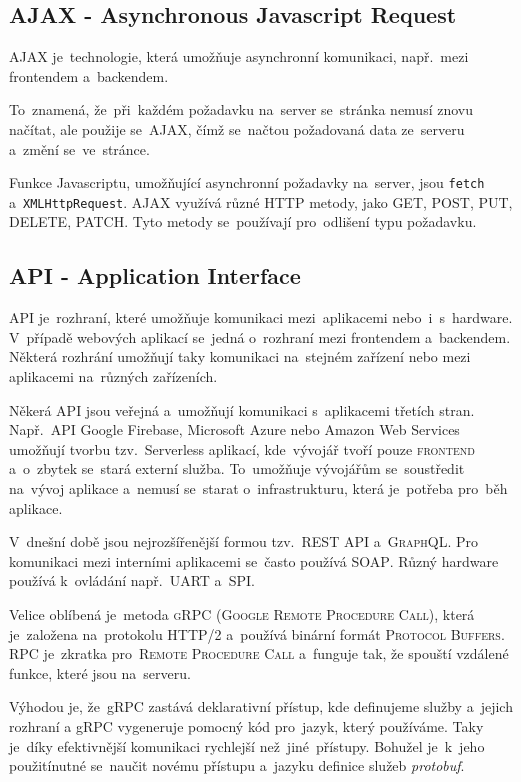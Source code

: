 \documentclass[14pt,a4paper]{article}
\begin{document}
        \subsection{AJAX - Asynchronous Javascript Request}
        \textsc{AJAX} je~technologie, která umožňuje asynchronní komunikaci, např.~mezi frontendem a~backendem.

        To~znamená, že~při~každém požadavku na~server se~stránka nemusí znovu načítat, ale použije se~\textsc{AJAX}, čímž se~načtou požadovaná data ze~serveru a~změní se~ve~stránce.

        Funkce Javascriptu, umožňující asynchronní požadavky na~server, jsou \texttt{fetch} a~\texttt{XMLHttpRequest}. AJAX využívá různé HTTP metody, jako GET, POST, PUT, DELETE, PATCH. Tyto metody se~používají pro~odlišení typu požadavku.\cite{ajax:mdn}

        \subsection{API - Application Interface}
        \textsc{API} je~rozhraní, které umožňuje komunikaci mezi~aplikacemi nebo~i~s~hardware. V~případě webových aplikací se~jedná o~rozhraní mezi frontendem a~backendem. Některá rozhrání umožňují taky komunikaci na~stejném zařízení nebo mezi aplikacemi na~různých zařízeních.
        
        Někerá \textsc{API} jsou veřejná a~umožňují komunikaci s~aplikacemi třetích stran. Např.~\textsc{API} Google Firebase, Microsoft Azure nebo Amazon Web Services umožňují tvorbu tzv.~Serverless aplikací, kde~vývojář tvoří pouze \textsc{frontend} a~o~zbytek se~stará externí služba. To~umožňuje vývojářům se~soustředit na~vývoj aplikace a~nemusí se~starat o~infrastrukturu, která je~potřeba pro~běh aplikace.

        V~dnešní době jsou nejrozšířenější formou tzv.~\textsc{REST API} a~\textsc{GraphQL}. Pro komunikaci mezi interními aplikacemi se~často používá \textsc{SOAP}. Různý hardware používá k~ovládání např.~\textsc{UART} a~\textsc{SPI}.

        Velice oblíbená je~metoda \textsc{gRPC} (\textsc{Google Remote Procedure Call}), která je~založena na~protokolu HTTP/2 a~používá binární formát \textsc{Protocol Buffers}. \textsc{RPC} je~zkratka pro~\textsc{Remote Procedure Call} a~funguje tak, že spouští vzdálené funkce, které jsou na~serveru.
        
        Výhodou je, že~gRPC zastává deklarativní přístup, kde definujeme služby a~jejich rozhraní a gRPC vygeneruje pomocný kód pro~jazyk, který používáme. Taky je~díky efektivnější komunikaci rychlejší než~jiné~přístupy. Bohužel je~k~jeho použitínutné se~naučit novému přístupu a~jazyku definice služeb \emph{protobuf}. \cite{thenewstackBuildRealWorld}
\end{document}
